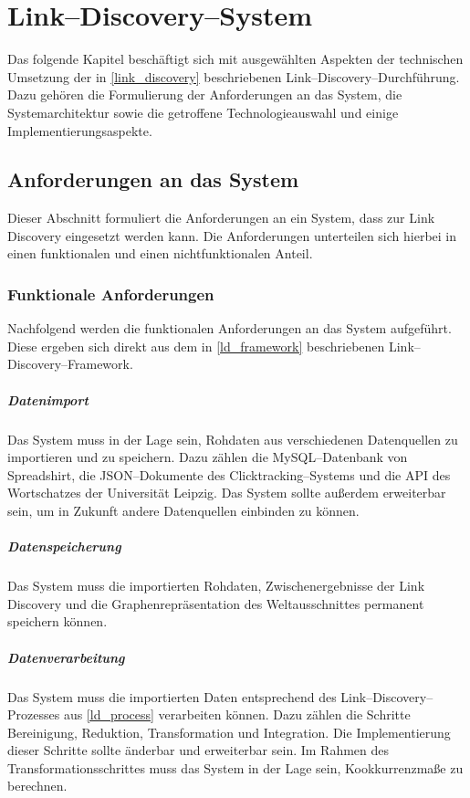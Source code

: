 \chapter{Link--Discovery--System}
\label{system}

Das folgende Kapitel beschäftigt sich mit ausgewählten Aspekten der technischen Umsetzung der in \cref{link_discovery} beschriebenen Link--Discovery--Durchführung. Dazu gehören die Formulierung der Anforderungen an das System, die Systemarchitektur sowie die getroffene Technologieauswahl und einige Implementierungsaspekte.

\section{Anforderungen an das System}

Dieser Abschnitt formuliert die Anforderungen an ein System, dass zur Link Discovery eingesetzt werden kann. Die Anforderungen unterteilen sich hierbei in einen funktionalen und einen nichtfunktionalen Anteil. 

\subsection{Funktionale Anforderungen}

Nachfolgend werden die funktionalen Anforderungen an das System aufgeführt. Diese ergeben sich direkt aus dem in \cref{ld_framework} beschriebenen Link--Discovery--Framework.

\paragraph{Datenimport} Das System muss in der Lage sein, Rohdaten aus verschiedenen Datenquellen zu importieren und zu speichern. Dazu zählen die MySQL--Datenbank von Spreadshirt, die JSON--Dokumente des Clicktracking--Systems und die API des Wortschatzes der Universität Leipzig. Das System sollte außerdem erweiterbar sein, um in Zukunft andere Datenquellen einbinden zu können.

\paragraph{Datenspeicherung} Das System muss die importierten Rohdaten, Zwischenergebnisse der Link Discovery und die Graphenrepräsentation des Weltausschnittes permanent speichern können.

\paragraph{Datenverarbeitung} Das System muss die importierten Daten entsprechend des Link--Discovery--Prozesses aus \cref{ld_process} verarbeiten können. Dazu zählen die Schritte Bereinigung, Reduktion, Transformation und Integration. Die Implementierung dieser Schritte sollte änderbar und erweiterbar sein. Im Rahmen des Transformationsschrittes muss das System in der Lage sein, Kookkurrenzmaße zu berechnen.

